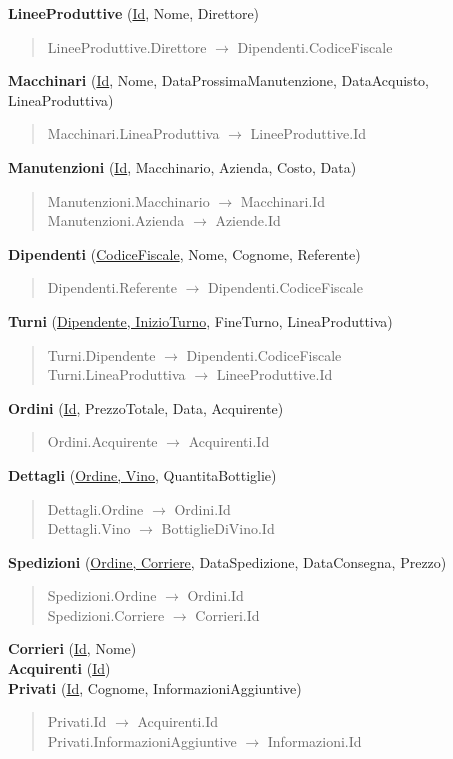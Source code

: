 \textbf{LineeProduttive} (\underline{Id}, Nome, Direttore)
\begin{verse}
	LineeProduttive.Direttore $\to$ Dipendenti.CodiceFiscale
\end{verse} 
\textbf{Macchinari} (\underline{Id}, Nome, DataProssimaManutenzione, DataAcquisto, LineaProduttiva)
\begin{verse}
	Macchinari.LineaProduttiva $\to$ LineeProduttive.Id
\end{verse} 
\textbf{Manutenzioni} (\underline{Id}, Macchinario, Azienda, Costo, Data)
\begin{verse}
	Manutenzioni.Macchinario $\to$ Macchinari.Id\\
	Manutenzioni.Azienda $\to$ Aziende.Id
\end{verse}
\textbf{Dipendenti} (\underline{CodiceFiscale}, Nome, Cognome, Referente)
\begin{verse}
	Dipendenti.Referente $\to$ Dipendenti.CodiceFiscale
\end{verse} 
\textbf{Turni} (\underline{Dipendente, InizioTurno}, FineTurno, LineaProduttiva)
\begin{verse}
	Turni.Dipendente $\to$ Dipendenti.CodiceFiscale\\
	Turni.LineaProduttiva $\to$ LineeProduttive.Id
\end{verse} 
\textbf{Ordini} (\underline{Id}, PrezzoTotale, Data, Acquirente)
\begin{verse}
	Ordini.Acquirente $\to$ Acquirenti.Id
\end{verse} 
\textbf{Dettagli} (\underline{Ordine, Vino}, QuantitaBottiglie)
\begin{verse}
	Dettagli.Ordine $\to$ Ordini.Id\\
	Dettagli.Vino $\to$ BottiglieDiVino.Id
\end{verse} 
\textbf{Spedizioni} (\underline{Ordine, Corriere}, DataSpedizione, DataConsegna, Prezzo)
\begin{verse}
	Spedizioni.Ordine $\to$ Ordini.Id\\
	Spedizioni.Corriere $\to$ Corrieri.Id
\end{verse} 
\textbf{Corrieri} (\underline{Id}, Nome)\\
\textbf{Acquirenti} (\underline{Id})\\
\textbf{Privati} (\underline{Id}, Cognome, InformazioniAggiuntive)
\begin{verse}
	Privati.Id $\to$ Acquirenti.Id\\
	Privati.InformazioniAggiuntive $\to$ Informazioni.Id
\end{verse} 

